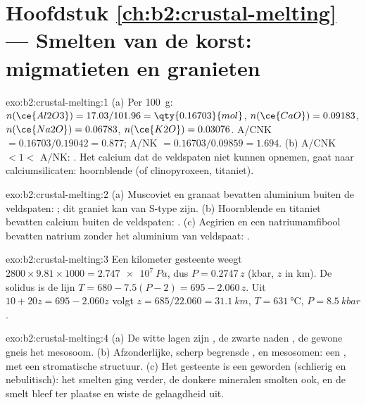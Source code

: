 \section*{Hoofdstuk \ref{ch:b2:crustal-melting} --- Smelten van de korst: migmatieten en granieten}

\begin{solution}{exo:b2:crustal-melting:1}
(a) Per \qty{100}{\gram}: $n(\ce{Al2O3}) = 17.03/101.96 = \qty{0.16703}{mol}$,
$n(\ce{CaO}) = 0.09183$, $n(\ce{Na2O}) = 0.06783$, $n(\ce{K2O}) = 0.03076$.
A/CNK $= 0.16703/0.19042 = 0.877$; A/NK $= 0.16703/0.09859 = 1.694$.
(b) A/CNK $< 1 <$ A/NK: . Het calcium dat de veldspaten niet kunnen opnemen, gaat naar
calciumsilicaten: hoornblende (of clinopyroxeen, titaniet).
\end{solution}

\begin{solution}{exo:b2:crustal-melting:2}
(a) Muscoviet en granaat bevatten aluminium buiten de veldspaten: ; dit graniet
kan van S-type zijn. (b) Hoornblende en titaniet bevatten calcium buiten de veldspaten:
. (c) Aegirien en een natriumamfibool bevatten natrium zonder het aluminium
van veldspaat: .
\end{solution}

\begin{solution}{exo:b2:crustal-melting:3}
Een kilometer gesteente weegt $2800\times9.81\times1000 = \qty{2.747e7}{Pa}$, dus
$P = 0.2747\,z$ (\unit{kbar}, $z$ in \unit{km}). De solidus is de lijn $T = 680 - 7.5(P -
2) = 695 - 2.060\,z$. Uit $10 + 20z = 695 - 2.060z$ volgt $z = 685/22.060 =
\qty{31.1}{km}$, $T = \qty{631}{\celsius}$, $P = \qty{8.5}{kbar}$.
\end{solution}

\begin{solution}{exo:b2:crustal-melting:4}
(a) De witte lagen zijn , de zwarte naden , de gewone gneis het
mesosoom. (b) Afzonderlijke, scherp begrensde ,  en mesosomen: een ,
met een stromatische structuur. (c) Het gesteente is een  geworden (schlierig en nebulitisch):
het smelten ging verder, de donkere mineralen smolten ook, en de smelt bleef ter plaatse en
wiste de gelaagdheid uit.
\end{solution}

